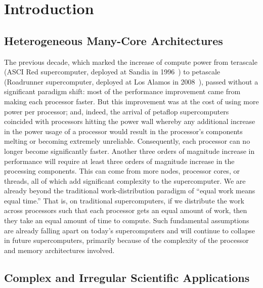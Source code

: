\chapter{Introduction}\label{sec:intro}

\section{Heterogeneous Many-Core Architectures}
The previous decade, which marked the increase of compute power from
terascale (ASCI Red supercomputer, deployed at Sandia in 1996~\cite{ascired}) to
petascale (Roadrunner supercomputer, deployed at Los Alamos in 2008~\cite{roadrunner}),
passed without a significant paradigm shift: most of the performance
improvement came from making each processor faster.
But this improvement was at the cost
of using more power per processor; and, indeed, the arrival of
petaflop supercomputers coincided with processors hitting the power
wall whereby any additional increase in the power usage of a processor would
result in the processor's components melting or becoming extremely
unreliable.  Consequently, each processor can no longer become
significantly faster.
Another three orders of magnitude increase
in performance will require at least three orders of magnitude
increase in the processing components.  This can come from
more nodes, processor cores, or threads, all of which add significant
complexity to the supercomputer.
We are already beyond the traditional work-distribution paradigm of
``equal work means equal time.''  That is, on traditional
supercomputers, if we distribute the work across processors such that
each processor gets an equal amount of work, then they take an
equal amount of time to compute.  Such fundamental assumptions are
already falling apart on today's supercomputers and will continue to
collapse in future supercomputers, primarily because of the complexity
of the processor and memory architectures involved.


\section{Complex and Irregular Scientific Applications}

